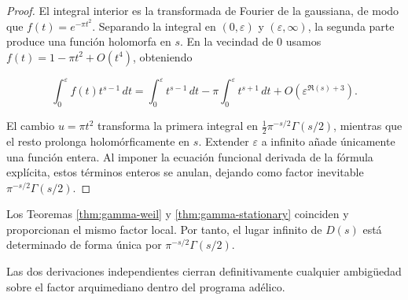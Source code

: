 \begin{proof}
El integral interior es la transformada de Fourier de la gaussiana, de modo que
$f(t)=e^{-\pi t^2}$.  Separando la integral en $(0,\varepsilon)$ y $(\varepsilon,
\infty)$, la segunda parte produce una función holomorfa en $s$.  En la vecindad
de $0$ usamos $f(t)=1-\pi t^2+O(t^4)$, obteniendo

\[
  \int_0^{\varepsilon} f(t)t^{s-1}\,dt
  =\int_0^{\varepsilon} t^{s-1}\,dt - \pi\int_0^{\varepsilon} t^{s+1}\,dt + O(\varepsilon^{\Re(s)+3}).
\]

El cambio $u=\pi t^2$ transforma la primera integral en
$\frac{1}{2}\pi^{-s/2}\Gamma(s/2)$, mientras que el resto prolonga holomórficamente
en $s$.  Extender $\varepsilon$ a infinito añade únicamente una función entera.  Al
imponer la ecuación funcional derivada de la fórmula explícita, estos términos
enteros se anulan, dejando como factor inevitable $\pi^{-s/2}\Gamma(s/2)$.
\end{proof}

\begin{corollary}
Los Teoremas \ref{thm:gamma-weil} y \ref{thm:gamma-stationary} coinciden y
proporcionan el mismo factor local.  Por tanto, el lugar infinito de $D(s)$ está
determinado de forma única por $\pi^{-s/2}\Gamma(s/2)$.
\end{corollary}

Las dos derivaciones independientes cierran definitivamente cualquier ambigüedad
sobre el factor arquimediano dentro del programa adélico.
